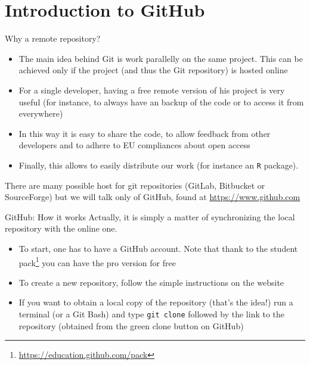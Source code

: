 \documentclass[aspectratio=169]{beamer}
\newcommand{\git}{Git{}}
\newcommand{\cd}[1]{\texttt{#1}}
\begin{document}
\section{Introduction to GitHub}
\begin{frame}{Why a remote repository?}
    \begin{itemize}
        \justifying
        \item The main idea behind \git{} is \alert{work parallelly} on the same project. This can be achieved only if the project (and thus the \git{} repository) is hosted online
        \item For a single developer, having a \alert{free remote version} of his project is very useful (for instance, to always have an backup of the code or to access it from everywhere)
        \item In this way it is easy to \alert{share the code}, to allow feedback from other developers and to adhere to EU compliances about open access
        \item Finally, this allows to easily \alert{distribute} our work (for instance an \cd{R} package).
    \end{itemize}
    There are many possible host for git repositories (GitLab, Bitbucket or SourceForge) but we will talk only of \alert{GitHub}, found at \url{https://www.github.com}
\end{frame}

\begin{frame}{GitHub: How it works}
    Actually, it is simply a matter of synchronizing the local repository with the online one.
    \begin{itemize}
        \justifying
        \item To start, one has to have a \alert{GitHub account}. Note that thank to the student pack\footnote{\url{https://education.github.com/pack}} you can have the pro version for free
        \item To create a \alert{new repository}, follow the simple instructions on the website
        \item If you want to obtain a local copy of the repository (that's the idea!) run a terminal (or a \git{} Bash) and type \cd{git clone} followed by the link to the repository (obtained from the green \alert{clone} button on GitHub)
    \end{itemize}
\end{frame}

\end{document}

